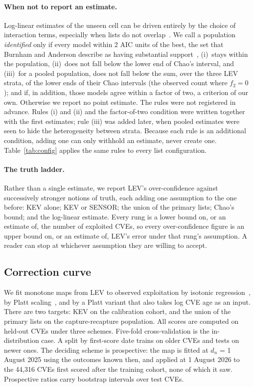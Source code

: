 \paragraph{When not to report an estimate.} Log-linear estimates of the unseen
cell can be driven entirely by the choice of interaction terms, especially when
lists do not overlap~\cite{chan2021sparse,binette2022mse}. We call a
population \emph{identified} only if every model within 2 AIC units of the best,
the set that Burnham and Anderson describe as having substantial
support~\cite{burnham2002}, (i)~stays within the population, (ii)~does not fall
below the lower end of Chao's interval, and (iii)~for a pooled population, does
not fall below the sum, over the three LEV strata, of the lower ends of their
Chao intervals (the observed count where $f_2 = 0$); and if, in addition, those
models agree within a factor of two, a criterion of our own. Otherwise we report no point estimate. The
rules were not registered in advance. Rules (i) and (ii) and the factor-of-two
condition were written together with the first estimates; rule (iii) was added
later, when pooled estimates were seen to hide the heterogeneity between
strata. Because each rule is an additional condition, adding one can only
withhold an estimate, never create one. Table~\ref{tab:config} applies the
same rules to every list configuration.

\paragraph{The truth ladder.} Rather than a single estimate, we report LEV's
over-confidence against successively stronger notions of truth, each adding one
assumption to the one before: KEV alone; KEV or SENSOR; the union of the
primary lists; Chao's bound; and the log-linear estimate. Every rung is a lower
bound on, or an estimate of, the number of exploited CVEs, so every
over-confidence figure is an upper bound on, or an estimate of, LEV's error
under that rung's assumption. A reader can stop at whichever assumption they are willing to
accept.

\subsection{Correction curve}\label{sec:m-correct}

We fit monotone maps from LEV to observed exploitation by isotonic
regression~\cite{zadrozny2002}, by Platt scaling~\cite{platt1999}, and by a
Platt variant that also takes log CVE age as an input. There are two targets:
KEV on the calibration cohort, and the union of the primary lists on the
capture-recapture population. All scores are computed on held-out CVEs under
three schemes. Five-fold cross-validation is the in-distribution case. A split
by first-score date trains on older CVEs and tests on newer ones. The deciding
scheme is prospective: the map is fitted at $d_n$ = 1 August 2025 using the
outcomes known then, and applied at 1 August 2026 to the 44,316 CVEs first
scored after the training cohort, none of which it saw. Prospective ratios carry
bootstrap intervals over test CVEs.

